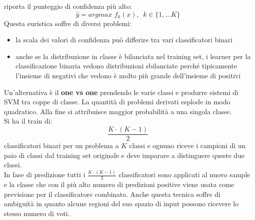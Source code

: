 riporta il punteggio di confidenza più alto:
\[\hat{y}=argmax\,\, f_k(x),\,\,\, k\in\{1,\ldots K\}\]
Questa euristica soffre di diversi problemi:
\begin{itemize}
  \item la scala dei valori di confidenza può differire tra vari classificatori
  binari 
  \item anche se la distribuzione in classe è bilanciata nel training set, i
  learner per la classificazione binaria vedono distribuzioni sbilanciate
  perché tipicamente l'insieme di negativi che vedono è molto più grande
  dell'insieme di positivi
\end{itemize}
Un'alternativa è il \textbf{one vs one} prendendo le varie classi e produrre
sistemi di SVM tra coppe di classe. La quantità di problemi derivati esplode in
modo quadratico. Alla fine si attribuisce maggior probabilità a una singola
classe.\\
Si ha il train di:
\[\frac{K\cdot (K-1)}{2}\]
classificatori binari per un problema a $K$ classi e ognuno riceve i campioni di
un paio di classi dal training set originale e deve imparare a
distinguere queste due classi.\\
In fase di predizione tutti i $\frac{K\cdot (K-1)}{2}$ classificatori sono
applicati al nuovo sample e la classe che con il più alto numero di predizioni
positive viene usata come previsione per il classificatore combinato. Anche
questa tecnica soffre di ambiguità in quanto alcune regioni del suo spazio di
input possono ricevere lo stesso numero di voti.

